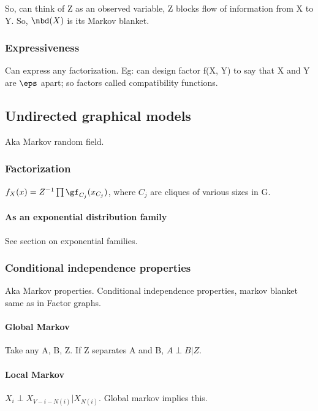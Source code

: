 \documentclass[oneside, article]{memoir}
\begin{document}
So, can think of Z as an observed variable, Z blocks flow of information from X to Y. So, $\nbd(X)$ is its Markov blanket.

\subsubsection{Expressiveness}
Can express any factorization. Eg: can design factor f(X, Y) to say that X and Y are $\eps$ apart; so factors called compatibility functions.

\subsection{Undirected graphical models}
Aka Markov random field.

\subsubsection{Factorization}
$f_X(x) = Z^{-1} \prod \gf_{C_j}(x_{C_{j}})$, where $C_{j}$ are cliques of various sizes in G.

\paragraph*{As an exponential distribution family}
See section on exponential families.

\subsubsection{Conditional independence properties}
Aka Markov properties. Conditional independence properties, markov blanket same as in Factor graphs.

\paragraph*{Global Markov}
Take any A, B, Z. If Z separates A and B, $A \perp B | Z$.


\paragraph*{Local Markov}
$X_i \perp X_{V - i - N(i)} | X_{N(i)}$. Global markov implies this.
\end{document}
